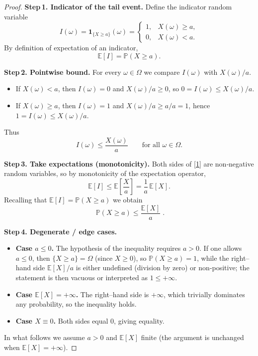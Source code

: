 \begin{proof}
\textbf{Step 1. Indicator of the tail event.}  
Define the indicator random variable  
\[
I(\omega)=\mathbf 1_{\{X\ge a\}}(\omega)=
\begin{cases}
1, & X(\omega)\ge a,\\[2mm]
0, & X(\omega)< a .
\end{cases}
\]
By definition of expectation of an indicator,
\[
\mathbb{E}[I]=\mathbb{P}(X\ge a).
\]

\textbf{Step 2. Pointwise bound.}  
For every $\omega\in\Omega$ we compare $I(\omega)$ with $X(\omega)/a$.

\begin{itemize}
\item If $X(\omega)<a$, then $I(\omega)=0$ and $X(\omega)/a\ge0$, so $0=I(\omega)\le X(\omega)/a$.
\item If $X(\omega)\ge a$, then $I(\omega)=1$ and $X(\omega)/a\ge a/a=1$, hence $1=I(\omega)\le X(\omega)/a$.
\end{itemize}

Thus
\begin{equation}
I(\omega)\le\frac{X(\omega)}{a}\qquad\text{for all }\omega\in\Omega.\tag{1}
\end{equation}

\textbf{Step 3. Take expectations (monotonicity).}  
Both sides of \eqref{1} are non‑negative random variables, so by monotonicity of the expectation operator,
\[
\mathbb{E}[I]\le\mathbb{E}\!\left[\frac{X}{a}\right]
               =\frac{1}{a}\,\mathbb{E}[X].
\]
Recalling that $\mathbb{E}[I]=\mathbb{P}(X\ge a)$ we obtain
\[
\boxed{\;\mathbb{P}(X\ge a)\le\frac{\mathbb{E}[X]}{a}\;}.
\]

\textbf{Step 4. Degenerate / edge cases.}
\begin{itemize}
\item \textbf{Case $a\le0$.}  The hypothesis of the inequality requires $a>0$.  If one allows $a\le0$, then $\{X\ge a\}=\Omega$ (since $X\ge0$), so $\mathbb{P}(X\ge a)=1$, while the right–hand side $\mathbb{E}[X]/a$ is either undefined (division by zero) or non‑positive; the statement is then vacuous or interpreted as $1\le+\infty$.
\item \textbf{Case $\mathbb{E}[X]=+\infty$.}  The right–hand side is $+\infty$, which trivially dominates any probability, so the inequality holds.
\item \textbf{Case $X\equiv0$.}  Both sides equal $0$, giving equality.
\end{itemize}
In what follows we assume $a>0$ and $\mathbb{E}[X]$ finite (the argument is unchanged when $\mathbb{E}[X]=+\infty$).


\end{proof}
